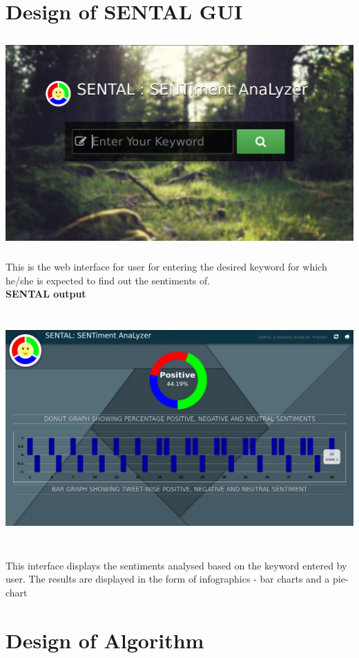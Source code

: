 \documentclass[a4paper,12pt]{report}
\begin{document}
\section{Design of SENTAL GUI}
\begin{center}
	\includegraphics[height=8cm,width=16cm]{images/homepage.jpg}
\end{center}
This is the web interface for user for entering the desired keyword for which he/she is expected to find out the sentiments of.\\ 
\textbf{SENTAL output}
\begin{center}
	\includegraphics[height=9cm,width=16cm]{images/output.jpg}
\end{center}
This interface displays the sentiments analysed based on the keyword entered by user. The results are displayed in the form of infographics - bar charts and a pie-chart
\section{Design of Algorithm}
\end{document}
